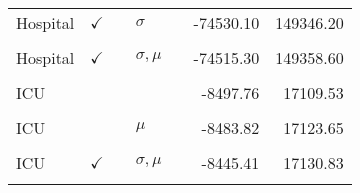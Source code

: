 \begin{table}[!h]
\begin{tabular}[t]{lllllrr}
Hospital & $\checkmark$ &  & $\sigma$ &  & -74530.10 & 149346.20\\
\cellcolor{gray!10}{Hospital} & \cellcolor{gray!10}{} & \cellcolor{gray!10}{} & \cellcolor{gray!10}{$\sigma, \mu$} & \cellcolor{gray!10}{} & \cellcolor{gray!10}{-74551.19} & \cellcolor{gray!10}{149346.39}\\
Hospital & $\checkmark$ &  & $\sigma, \mu$ &  & -74515.30 & 149358.60\\
\cellcolor{gray!10}{ICU} & \cellcolor{gray!10}{} & \cellcolor{gray!10}{} & \cellcolor{gray!10}{$\sigma$} & \cellcolor{gray!10}{} & \cellcolor{gray!10}{-8471.84} & \cellcolor{gray!10}{17099.69}\\
ICU &  &  &  &  & -8497.76 & 17109.53\\
\cellcolor{gray!10}{ICU} & \cellcolor{gray!10}{$\checkmark$} & \cellcolor{gray!10}{} & \cellcolor{gray!10}{$\sigma$} & \cellcolor{gray!10}{} & \cellcolor{gray!10}{-8461.73} & \cellcolor{gray!10}{17121.46}\\
ICU &  &  & $\mu$ &  & -8483.82 & 17123.65\\
\cellcolor{gray!10}{ICU} & \cellcolor{gray!10}{$\checkmark$} & \cellcolor{gray!10}{} & \cellcolor{gray!10}{} & \cellcolor{gray!10}{} & \cellcolor{gray!10}{-8486.04} & \cellcolor{gray!10}{17128.07}\\
ICU & $\checkmark$ &  & $\sigma, \mu$ &  & -8445.41 & 17130.83\\
\cellcolor{gray!10}{ICU} & \cellcolor{gray!10}{$\checkmark$} & \cellcolor{gray!10}{} & \cellcolor{gray!10}{$\mu$} & \cellcolor{gray!10}{} & \cellcolor{gray!10}{-8474.92} & \cellcolor{gray!10}{17147.85}\\
\bottomrule
\end{tabular}
\end{table}
